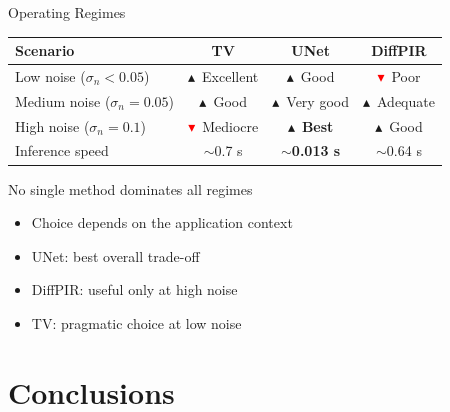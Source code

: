 \documentclass[english,10pt]{beamer}
\newcommand{\upgreen}{\textcolor{green!50!black}{$\blacktriangle$}}
\newcommand{\downred}{\textcolor{red}{$\blacktriangledown$}}
\begin{document}
\begin{frame}{Operating Regimes}
  \begin{center}
    \begin{tabular}{lccc}\toprule
      \textbf{Scenario} & \textbf{TV} & \textbf{UNet} & \textbf{DiffPIR}\\\midrule
      Low noise ($\sigma_n<0.05$) & \upgreen\ Excellent & \upgreen\ Good & \downred\ Poor\\
      Medium noise ($\sigma_n=0.05$) & \upgreen\ Good & \upgreen\ Very good & \upgreen\ Adequate\\
      High noise ($\sigma_n=0.1$)   & \downred\ Mediocre & \upgreen\ \textbf{Best} & \upgreen\ Good\\
      Inference speed           & $\sim$0.7 s & $\sim$\textbf{0.013 s} & $\sim$0.64 s\\\bottomrule
    \end{tabular}
  \end{center}
  \vspace{0.3cm}
  \begin{block}{No single method dominates all regimes}
    \begin{itemize}
      \item Choice depends on the application context
      \item UNet: best overall trade-off
      \item DiffPIR: useful only at high noise
      \item TV: pragmatic choice at low noise
    \end{itemize}
  \end{block}
\end{frame}

\section{Conclusions}
\end{document}

